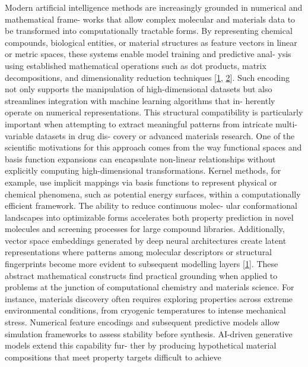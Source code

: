 \documentclass[
]{article}
\begin{document}
Modern artificial intelligence methods are increasingly grounded in
numerical and mathematical frame- works that allow complex molecular and
materials data to be transformed into computationally tractable forms.
By representing chemical compounds, biological entities, or material
structures as feature vectors in linear or metric spaces, these systems
enable model training and predictive anal- ysis using established
mathematical operations such as dot products, matrix decompositions, and
dimensionality reduction techniques
{[}\protect\hyperlink{_bookmark41}{1},
\protect\hyperlink{_bookmark42}{2}{]}. Such encoding not only supports
the manipulation of high-dimensional datasets but also streamlines
integration with machine learning algorithms that in- herently operate
on numerical representations. This structural compatibility is
particularly important when attempting to extract meaningful patterns
from intricate multi-variable datasets in drug dis- covery or advanced
materials research. One of the scientific motivations for this approach
comes from the way functional spaces and basis function expansions can
encapsulate non-linear relationships without explicitly computing
high-dimensional transformations. Kernel methods, for example, use
implicit mappings via basis functions to represent physical or chemical
phenomena, such as potential energy surfaces, within a computationally
efficient framework. The ability to reduce continuous molec- ular
conformational landscapes into optimizable forms accelerates both
property prediction in novel molecules and screening processes for large
compound libraries. Additionally, vector space embeddings generated by
deep neural architectures create latent representations where patterns
among molecular descriptors or structural fingerprints become more
evident to subsequent modelling layers
{[}\protect\hyperlink{_bookmark41}{1}{]}. These abstract mathematical
constructs find practical grounding when applied to problems at the
junction of computational chemistry and materials science. For instance,
materials discovery often requires exploring properties across extreme
environmental conditions, from cryogenic temperatures to intense
mechanical stress. Numerical feature encodings and subsequent predictive
models allow simulation frameworks to assess stability before synthesis.
AI-driven generative models extend this capability fur- ther by
producing hypothetical material compositions that meet property targets
difficult to achieve
\end{document}
